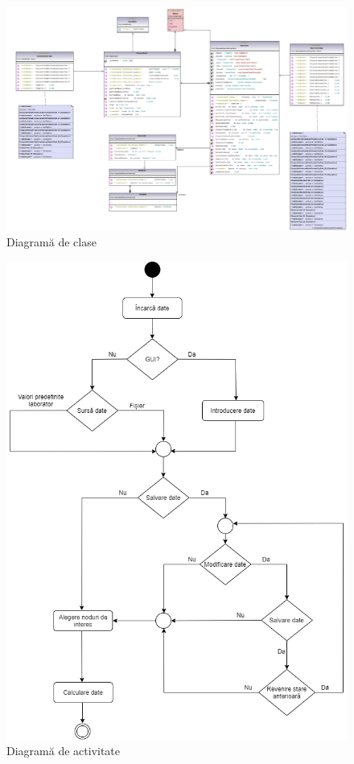 \documentclass[12pt]{article}
\begin{document}
\begin{figure}[H]
	\centering
	\includegraphics[width=\linewidth]{img/classDiagram.png}
	\caption{Diagramă de clase}
\end{figure}
\begin{figure}[H]
	\centering
	\includegraphics[width=\linewidth]{img/diagrama-activitate.png}
	\caption{Diagramă de activitate}
\end{figure}
\end{document}
